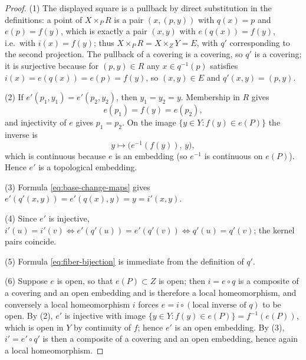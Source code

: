 \begin{proof}
(1)  The displayed square is a pullback by direct substitution in the definitions: a point of \(X\times_PR\) is a pair \((x,(p,y))\) with \(q(x)=p\) and \(e(p)=f(y)\), which is exactly a pair \((x,y)\) with \(e(q(x))=f(y)\), i.e.\ with \(i(x)=f(y)\); thus \(X\times_PR=X\times_ZY=E\), with \(q'\) corresponding to the second projection.  The pullback of a covering is a covering, so \(q'\) is a covering; it is surjective because for \((p,y)\in R\) any \(x\in q^{-1}(p)\) satisfies \(i(x)=e(q(x))=e(p)=f(y)\), so \((x,y)\in E\) and \(q'(x,y)=(p,y)\).

(2)  If \(e'(p_1,y_1)=e'(p_2,y_2)\), then \(y_1=y_2=y\).  Membership in \(R\) gives
\[
e(p_1)=f(y)=e(p_2),
\]
and injectivity of \(e\) gives \(p_1=p_2\).  On the image \(\{y\in Y:f(y)\in e(P)\}\) the inverse is
\[
y\longmapsto\bigl(e^{-1}(f(y)),\,y\bigr),
\]
which is continuous because \(e\) is an embedding (so \(e^{-1}\) is continuous on \(e(P)\)).  Hence \(e'\) is a topological embedding.

(3)  Formula \eqref{eq:base-change-maps} gives \(e'(q'(x,y))=e'(q(x),y)=y=i'(x,y)\).

(4)  Since \(e'\) is injective, \(i'(u)=i'(v)\iff e'(q'(u))=e'(q'(v))\iff q'(u)=q'(v)\); the kernel pairs coincide.

(5)  Formula \eqref{eq:fiber-bijection} is immediate from the definition of \(q'\).

(6)  Suppose \(e\) is open, so that \(e(P)\subset Z\) is open; then \(i=e\circ q\) is a composite of a covering and an open embedding and is therefore a local homeomorphism, and conversely a local homeomorphism \(i\) forces \(e=i\circ(\text{local inverse of }q)\) to be open.  By (2), \(e'\) is injective with image \(\{y\in Y:f(y)\in e(P)\}=f^{-1}(e(P))\), which is open in \(Y\) by continuity of \(f\); hence \(e'\) is an open embedding.  By (3), \(i'=e'\circ q'\) is then a composite of a covering and an open embedding, hence again a local homeomorphism.
\end{proof}

